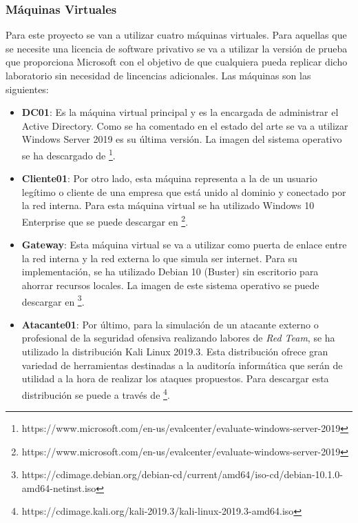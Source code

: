 \subsubsection{Máquinas Virtuales}

Para este proyecto se van a utilizar cuatro máquinas virtuales. Para aquellas que se necesite una licencia de software privativo se va a utilizar la versión de prueba que proporciona Microsoft con el objetivo de que cualquiera pueda replicar dicho laboratorio sin necesidad de lincencias adicionales. Las máquinas son las siguientes:

\begin{itemize}
\item \textbf{DC01}: Es la máquina virtual principal y es la encargada de administrar el Active Directory. Como se ha comentado en el estado del arte se va a utilizar Windows Server 2019 es su última versión. La imagen del sistema operativo se ha descargado de \footnote{https://www.microsoft.com/en-us/evalcenter/evaluate-windows-server-2019}.

\item \textbf{Cliente01}: Por otro lado, esta máquina representa a la de un usuario legítimo o cliente de una empresa que está unido al dominio y conectado por la red interna. Para esta máquina virtual se ha utilizado Windows 10 Enterprise que se puede descargar en \footnote{https://www.microsoft.com/en-us/evalcenter/evaluate-windows-server-2019}. 

\item \textbf{Gateway}: Esta máquina virtual se va a utilizar como puerta de enlace entre la red interna y la red externa lo que simula ser internet. Para su implementación, se ha utilizado Debian 10 (Buster) sin escritorio para ahorrar recursos locales. La imagen de este sistema operativo se puede descargar en \footnote{https://cdimage.debian.org/debian-cd/current/amd64/iso-cd/debian-10.1.0-amd64-netinst.iso}.

\item \textbf{Atacante01}: Por último, para la simulación de un atacante externo o profesional de la seguridad ofensiva realizando labores de {\it Red Team}, se ha utilizado la distribución Kali Linux 2019.3. Esta distribución ofrece gran variedad de herramientas destinadas a la auditoría informática que serán de utilidad a la hora de realizar los ataques propuestos. Para descargar esta distribución se puede a través de \footnote{https://cdimage.kali.org/kali-2019.3/kali-linux-2019.3-amd64.iso}.

\end{itemize}


